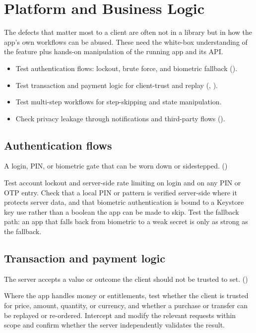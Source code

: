 \chapter{Platform and Business Logic}\label{ch:logic}

The defects that matter most to a client are often not in a library but in how the app's own workflows can be abused. These need the white-box understanding of the feature plus hands-on manipulation of the running app and its API.

\begin{objectives}
\begin{itemize}[leftmargin=12pt]
\item Test authentication flows: lockout, brute force, and biometric fallback ().
\item Test transaction and payment logic for client-trust and replay (, ).
\item Test multi-step workflows for step-skipping and state manipulation.
\item Check privacy leakage through notifications and third-party flows ().
\end{itemize}
\end{objectives}

\section{Authentication flows}
\begin{findingbox}
A login, PIN, or biometric gate that can be worn down or sidestepped. ()
\end{findingbox}
Test account lockout and server-side rate limiting on login and on any PIN or OTP entry. Check that a local PIN or pattern is verified server-side where it protects server data, and that biometric authentication is bound to a Keystore key use rather than a boolean the app can be made to skip. Test the fallback path: an app that falls back from biometric to a weak secret is only as strong as the fallback.

\section{Transaction and payment logic}
\begin{findingbox}
The server accepts a value or outcome the client should not be trusted to set. ()
\end{findingbox}
Where the app handles money or entitlements, test whether the client is trusted for price, amount, quantity, or currency, and whether a purchase or transfer can be replayed or re-ordered. Intercept and modify the relevant requests within scope and confirm whether the server independently validates the result.

